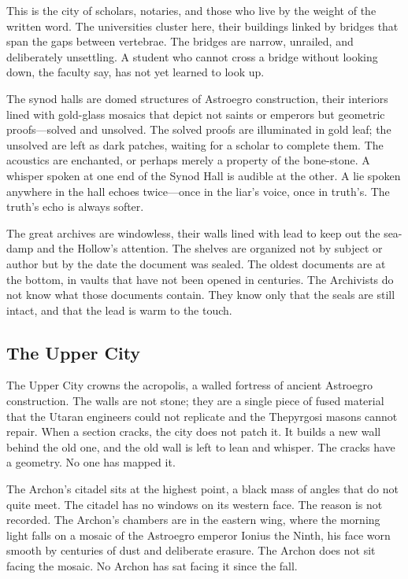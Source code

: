 \documentclass[10pt,twocolumn]{book}
\begin{document}
This is the city of scholars, notaries, and those who live by the weight of the written word. The universities cluster here, their buildings linked by bridges that span the gaps between vertebrae. The bridges are narrow, unrailed, and deliberately unsettling. A student who cannot cross a bridge without looking down, the faculty say, has not yet learned to look up.

The synod halls are domed structures of Astroegro construction, their interiors lined with gold-glass mosaics that depict not saints or emperors but geometric proofs---solved and unsolved. The solved proofs are illuminated in gold leaf; the unsolved are left as dark patches, waiting for a scholar to complete them. The acoustics are enchanted, or perhaps merely a property of the bone-stone. A whisper spoken at one end of the Synod Hall is audible at the other. A lie spoken anywhere in the hall echoes twice---once in the liar's voice, once in truth's. The truth's echo is always softer.

The great archives are windowless, their walls lined with lead to keep out the sea-damp and the Hollow's attention. The shelves are organized not by subject or author but by the date the document was sealed. The oldest documents are at the bottom, in vaults that have not been opened in centuries. The Archivists do not know what those documents contain. They know only that the seals are still intact, and that the lead is warm to the touch.

\subsection{The Upper City}

The Upper City crowns the acropolis, a walled fortress of ancient Astroegro construction. The walls are not stone; they are a single piece of fused material that the Utaran engineers could not replicate and the Thepyrgosi masons cannot repair. When a section cracks, the city does not patch it. It builds a new wall behind the old one, and the old wall is left to lean and whisper. The cracks have a geometry. No one has mapped it.

The Archon's citadel sits at the highest point, a black mass of angles that do not quite meet. The citadel has no windows on its western face. The reason is not recorded. The Archon's chambers are in the eastern wing, where the morning light falls on a mosaic of the Astroegro emperor Ionius the Ninth, his face worn smooth by centuries of dust and deliberate erasure. The Archon does not sit facing the mosaic. No Archon has sat facing it since the fall.
\end{document}
